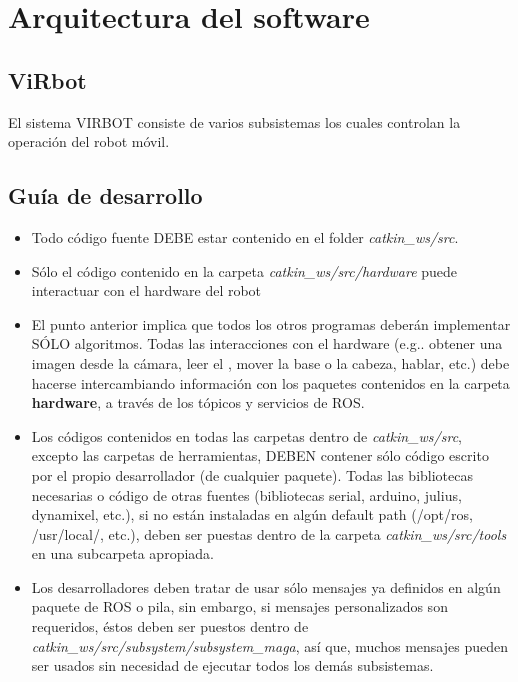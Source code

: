 \documentclass[user_manual.tex]{subfiles}
\begin{document}
 
 \chapter{Arquitectura del software}

\section{ViRbot}
El sistema VIRBOT consiste de varios subsistemas los cuales controlan la operación del robot móvil.

\section{Guía de desarrollo}
\begin{itemize}
 \item Todo código fuente DEBE estar contenido en el folder \textit{catkin\_ws/src}.\\
 
 \item Sólo el código contenido en la carpeta \textit{catkin\_ws/src/hardware} puede interactuar con el 
 hardware del robot\\
 
 \item El punto anterior implica que todos los otros programas deberán implementar SÓLO algoritmos. 
 Todas las interacciones con el hardware (e.g.. obtener una imagen desde la cámara, leer el , 
 mover la base o la cabeza, hablar, etc.) debe hacerse intercambiando información con los paquetes
 contenidos en la carpeta \textbf{hardware}, a través de los tópicos y servicios de ROS.
 
 \item Los códigos contenidos en todas las carpetas dentro de \textit{catkin\_ws/src}, excepto las carpetas de 
 herramientas, DEBEN contener sólo código escrito por el propio desarrollador (de cualquier paquete).
 Todas las bibliotecas necesarias o código de otras fuentes (bibliotecas serial, arduino, julius,
 dynamixel, etc.), si no están instaladas en algún default path (/opt/ros, /usr/local/, etc.), deben 
 ser puestas dentro de la carpeta \textit{catkin\_ws/src/tools} en una subcarpeta apropiada.\\
 
 \item Los desarrolladores deben tratar de usar sólo mensajes ya definidos en algún paquete de ROS o
 pila, sin embargo, si mensajes personalizados son requeridos, éstos deben ser puestos dentro de
 \textit{catkin\_ws/src/subsystem/subsystem\_maga}, así que, muchos mensajes pueden ser usados sin necesidad
 de ejecutar todos los demás subsistemas.\\
\end{itemize}
\end{document}

